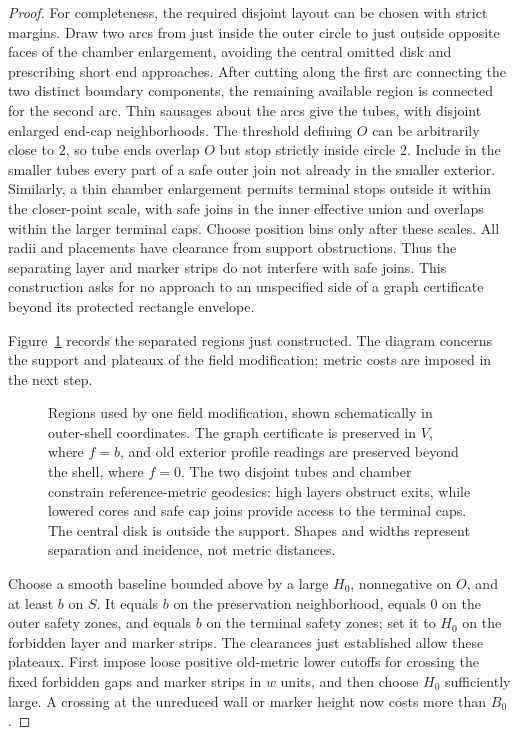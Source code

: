\begin{proof}
For completeness, the required disjoint layout can be chosen with strict
margins. Draw two arcs from just inside the outer circle to just outside
opposite faces of the chamber enlargement, avoiding the central omitted
disk and prescribing short end approaches. After cutting along the first
arc connecting the two distinct boundary components, the remaining
available region is connected for the second arc. Thin sausages about the
arcs give the tubes, with disjoint enlarged end-cap neighborhoods. The
threshold defining $O$ can be arbitrarily close to $2$, so tube ends
overlap $O$ but stop strictly inside circle $2$. Include in the smaller
tubes every part of a safe outer join not already in the smaller exterior.
Similarly, a thin chamber enlargement permits terminal stops outside it
within the closer-point scale, with safe joins in the inner effective
union and overlaps within the larger terminal caps. Choose position bins
only after these scales. All radii and placements have clearance from
support obstructions. Thus the separating layer and marker strips do not
interfere with safe joins. This construction asks for no approach to an
unspecified side of a graph certificate beyond its protected rectangle
envelope.

Figure~\ref{fig:protected-shortcut} records the separated regions just
constructed. The diagram concerns the support and plateaux of the field
modification; metric costs are imposed in the next step.

\begin{figure}[htbp]
\centering

\caption{Regions used by one field modification, shown schematically in
outer-shell coordinates. The graph certificate is preserved in \(V\),
where \(f=b\), and old exterior profile readings are preserved beyond
the shell, where \(f=0\). The two disjoint tubes and chamber constrain
reference-metric geodesics: high layers obstruct exits, while lowered
cores and safe cap joins provide access to the terminal caps. The central disk is outside the support.
Shapes and widths represent separation and incidence, not metric distances.}
\label{fig:protected-shortcut}
\end{figure}

Choose a smooth baseline bounded above by a large $H_0$, nonnegative on
$O$, and at least $b$ on $S$. It equals $b$ on the preservation
neighborhood, equals $0$ on the outer safety zones, and equals $b$ on the
terminal safety zones; set it to $H_0$ on the forbidden layer and marker
strips. The clearances just established allow these plateaux. First impose
loose positive old-metric lower cutoffs for crossing the fixed forbidden
gaps and marker strips in $w$ units, and then choose $H_0$ sufficiently
large. A crossing at the unreduced wall or marker height now costs more
than $B_0$.


\end{proof}
